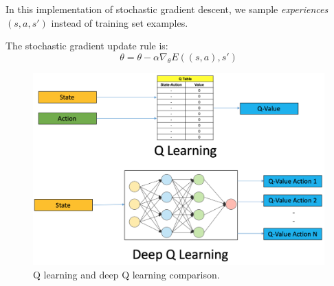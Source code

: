 In this implementation of stochastic gradient descent, we sample \textit{experiences} $(s,a,s')$ instead of training set examples. \newline

The stochastic gradient update rule is:
\begin{equation}
    \theta = \theta - \alpha \nabla_{\theta}E((s,a), s')
\end{equation}

\begin{figure}
    \centering
    \includegraphics[width=\textwidth]{images/deepQLearning.png}
    \caption{Q learning and deep Q learning comparison.}
    \label{fig:reinforcementLearningDeep}
\end{figure}